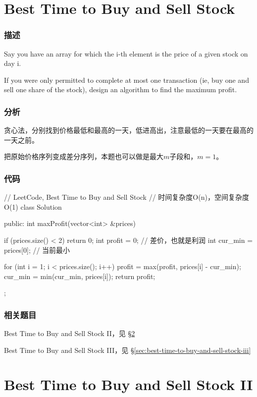 \section{Best Time to Buy and Sell Stock} %
\label{sec:best-time-to-buy-and-sell-stock}


\subsubsection{描述}
Say you have an array for which the i-th element is the price of a given stock on day i.

If you were only permitted to complete at    most one transaction (ie, buy one and sell one share of the stock), design an algorithm to find the maximum profit.


\subsubsection{分析}
贪心法，分别找到价格最低和最高的一天，低进高出，注意最低的一天要在最高的一天之前。

把原始价格序列变成差分序列，本题也可以做是最大$m$子段和，$m=1$。

\subsubsection{代码}
\begin{Code}
// LeetCode, Best Time to Buy and Sell Stock
// 时间复杂度O(n)，空间复杂度O(1)
class Solution {
public:
    int maxProfit(vector<int> &prices) {
        if (prices.size() < 2) return 0;
        int profit = 0;  // 差价，也就是利润
        int cur_min = prices[0]; // 当前最小

        for (int i = 1; i < prices.size(); i++) {
            profit = max(profit, prices[i] - cur_min);
            cur_min = min(cur_min, prices[i]);
        }
        return profit;
    }
};
\end{Code}


\subsubsection{相关题目}
\begindot
\item Best Time to Buy and Sell Stock II，见 \S \ref{sec:best-time-to-buy-and-sell-stock-ii}
\item Best Time to Buy and Sell Stock III，见 \S \ref{sec:best-time-to-buy-and-sell-stock-iii}
\myenddot


\section{Best Time to Buy and Sell Stock II} %
\label{sec:best-time-to-buy-and-sell-stock-ii}


